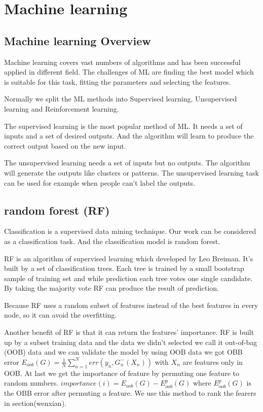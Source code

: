 \section{Machine learning } %
\label{sec:Maschine_learning}
\subsection{Machine learning Overview} %

 Machine learning covers vast numbers of algorithms and has been successful applied in different field. The challenges of ML are finding the best model which is suitable for this task, fitting the parameters and selecting the features. 
 
Normally we split the ML methods into Supervised learning, Unsupervised learning and Reinforcement learning\cite{russell2003artificial}. 

The supervised learning is the most popular method of ML. It needs a set of inputs and a set of desired outputs. And the algorithm will learn to produce the correct output based on the new input. 

The unsupervised learning needs a set of inputs but no outputs. The algorithm will generate the outputs like clusters or patterns. The unsupervised learning task can be used for example when people can't label the outputs. 

\subsection{random forest (RF)} %
Classification is a supervised data mining technique. Our work can be considered as a classification task. And the classification model is random forest.

RF is an algorithm of supervised learning which developed by Leo Breiman\cite{breiman2001random}. It's built by a set of classification trees\cite{breiman1984classification}. Each tree is trained by a small bootstrap sample of training set and while prediction each tree votes one single candidate. By taking the majority vote RF can produce the result of prediction. 

Because RF uses a random subset of features instead of the best features in every node, so it can avoid the overfitting\cite{breiman2001random}. 

Another benefit of RF is that it can return the features' importance. RF is built up by a subset training data and the data we didn't selected we call it out-of-bag (OOB) data and we can validate the model by using OOB data we got OBB error $E_{oob}(G) = \frac {1}{N} \sum_{n=1}^{N}err(y_n,G_{n}^-(X_n))$ with $X_n$ are features only in OOB. At last we get the importance of feature by permuting one feature to random numbers. $importance(i)= E_{oob}(G)-E_{oob}^{p}(G)$ where $E_{oob}^{p}(G)$ is the OBB error after permuting a feature. We use this method to rank the fearers in section(wenxian).

